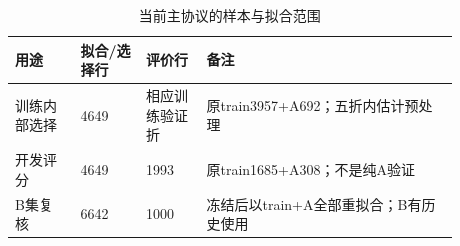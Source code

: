 \begin{table}[htbp]
\small
\setlength{\tabcolsep}{5pt}
\centering
\caption{当前主协议的样本与拟合范围}
\label{tab:protocol}
\begin{tabular}{L{0.13\linewidth}L{0.13\linewidth}L{0.12\linewidth}L{0.5\linewidth}}
\toprule
用途 & 拟合/选择行 & 评价行 & 备注 \\
\midrule
训练内部选择 & 4649 & 相应训练验证折 & 原train3957+A692；五折内估计预处理 \\
开发评分 & 4649 & 1993 & 原train1685+A308；不是纯A验证 \\
B集复核 & 6642 & 1000 & 冻结后以train+A全部重拟合；B有历史使用 \\
\bottomrule
\end{tabular}
\end{table}
